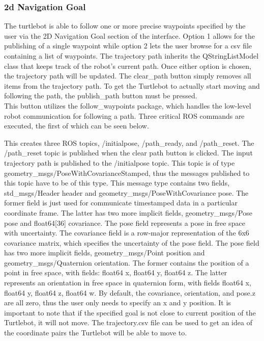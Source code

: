 \documentclass[12]{article}
\begin{document}
\subsubsection{2d Navigation Goal}
The turtlebot is able to follow one or more precise waypoints specified by the user via the 2D Navigation Goal section of the interface. Option 1 allows for the publishing of a single waypoint while option 2 lets the user browse for a csv file containing a list of waypoints. The trajectory path inherits the QStringListModel class that keeps track of the robot's current path. Once either option is chosen, the trajectory path will be updated. The clear\_path button simply removes all items from the trajectory path. To get the Turtlebot to actually start moving and following the path, the publish\_path button must be pressed.\\ 

This button utilizes the follow\_waypoints package, which handles the low-level robot communication for following a path. Three critical ROS commands are executed, the first of which can be seen below.

%

This creates three ROS topics, /initialpose, /path\_ready, and /path\_reset. The /path\_reset topic is published when the clear path button is clicked. The input trajectory path is published to the /initialpose topic. This topic is of type geometry\_msgs/PoseWithCovarianceStamped, thus the messages published to this topic have to be of this type. This message type contains two fields, std\_msgs/Header header and geometry\_msgs/PoseWithCovariance pose. The former field is just used for communicate timestamped data in a particular coordinate frame. The latter has two more implicit fields, geometry\_msgs/Pose pose and float64[36] covariance. The pose field represents a pose in free space with uncertainty. The covariance field is a row-major representation of the 6x6 covariance matrix, which specifies the uncertainty of the pose field. The pose field has two more implicit fields, geometry\_msgs/Point position and geometry\_msgs/Quaternion orientation. The former contains the position of a point in free space, with fields: float64 x, float64 y, float64 z. The latter represents an orientation in free space in quaternion form, with fields float64 x, float64 y, float64 z, float64 w. By default, the covariance, orientation, and pose.z are all zero, thus the user only needs to specify an x and y position. It is important to note that if the specified goal is not close to current position of the Turtlebot, it will not move. The trajectory.csv file can be used to get an idea of the coordinate pairs the Turtlebot will be able to move to.\\
\end{document}
